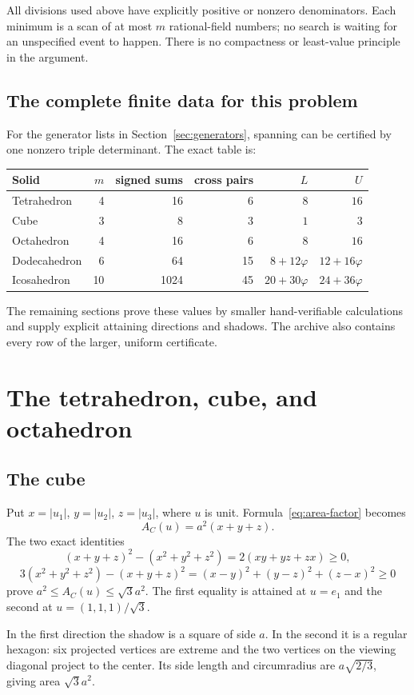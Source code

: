 \documentclass[11pt,a4paper]{article}
\newcommand{\ph}{\varphi}
\newcommand{\abs}[1]{\left|#1\right|}
\begin{document}
All divisions used above have explicitly positive or nonzero denominators. Each minimum is a scan of at most $m$ rational-field numbers; no search is waiting for an unspecified event to happen. There is no compactness or least-value principle in the argument.

\subsection{The complete finite data for this problem}
For the generator lists in Section~\ref{sec:generators}, spanning can be certified by one nonzero triple determinant. The exact table is:
\begin{center}
\renewcommand{\arraystretch}{1.25}
\begin{tabular}{@{}lrrrrr@{}}
\toprule
Solid & $m$ & signed sums & cross pairs & $L$ & $U$\\
\midrule
Tetrahedron &4&16&6&$8$&$16$\\
Cube &3&8&3&$1$&$3$\\
Octahedron &4&16&6&$8$&$16$\\
Dodecahedron &6&64&15&$8+12\ph$&$12+16\ph$\\
Icosahedron &10&1024&45&$20+30\ph$&$24+36\ph$\\
\bottomrule
\end{tabular}
\end{center}
The remaining sections prove these values by smaller hand-verifiable calculations and supply explicit attaining directions and shadows. The archive also contains every row of the larger, uniform certificate.

\section{The tetrahedron, cube, and octahedron}\label{sec:simple}

\subsection{The cube}
Put $x=\abs{u_1}$, $y=\abs{u_2}$, $z=\abs{u_3}$, where $u$ is unit. Formula~\eqref{eq:area-factor} becomes
\[
 A_C(u)=a^2(x+y+z).
\]
The two exact identities
\[
 (x+y+z)^2-(x^2+y^2+z^2)=2(xy+yz+zx)\ge0,
\]
\[
 3(x^2+y^2+z^2)-(x+y+z)^2=(x-y)^2+(y-z)^2+(z-x)^2\ge0
\]
prove $a^2\le A_C(u)\le\sqrt3a^2$. The first equality is attained at $u=e_1$ and the second at $u=(1,1,1)/\sqrt3$.

In the first direction the shadow is a square of side $a$. In the second it is a regular hexagon: six projected vertices are extreme and the two vertices on the viewing diagonal project to the center. Its side length and circumradius are $a\sqrt{2/3}$, giving area $\sqrt3a^2$.
\end{document}
